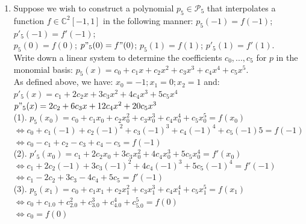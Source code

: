\documentclass[14pt,a4paper]{article}
\begin{document}
	\begin{enumerate}
		\item Suppose we wish to construct a polynomial $p_5 \in \mathcal{P}_5$ that interpolates a function $f \in \mathbb{C}^2[-1, 1]$ in the following manner: $p_5(-1) = f(-1)$; \hspace{0.2cm} $p'_5(-1) = f'(-1)$;\\ $p_5(0) = f(0)$; \hspace{0.2cm} $ p"_5(0) = f"(0)$; \hspace{0.2cm} $p_5(1) = f(1)$; \hspace{0.2cm} $p'_5(1) = f'(1)$.  \\
		Write down a linear system to determine the coefficients $c_0, ..., c_5$ for $p$ in the monomial basis: $p_5(x) = c_0 + c_1x + c_2x^2 + c_3x^3 + c_4x^4 + c_5x^5$.\\
		As defined above, we have: $x_0 = -1; x_1 = 0; x_2 = 1$ and:\\
		\hspace*{2cm} $p'_5(x) = c_1 + 2c_2x + 3c_3x^2 + 4c_4x^3 + 5c_5x^4$\\
		\hspace*{2cm} $p"_5(x) = 2c_2 + 6c_3x + 12c_4x^2 + 20c_5x^3$\\
		(1). $ p_5(x_0) = c_0 + c_1x_0 + c_2x_0^2 + c_3x_0^3 + c_4x_0^4 + c_5x_0^5 = f(x_0)$\\
		\hspace*{1.9cm} $ \Leftrightarrow c_0 + c_1(-1) + c_2(-1)^2 + c_3(-1)^3 + c_4(-1)^4 + c_5(-1)5 = f(-1)$\\
		\hspace*{1.9cm} $ \Leftrightarrow c_0 - c_1 + c_2 - c_3 + c_4 - c_5 = f(-1)$\\
		(2). $p'_5(x_0) = c_1 + 2c_2x_0 + 3c_3x_0^2 + 4c_4x_0^3 + 5c_5x_0^4 = f'(x_0)$\\
		\hspace*{1.85cm} $ \Leftrightarrow c_1 + 2c_2(-1) + 3c_3(-1)^2 + 4c_4(-1)^3 + 5c_5(-1)^4 = f'(-1)$ \\
		\hspace*{1.85cm} $ \Leftrightarrow c_1 - 2c_2 + 3c_3 - 4c_4 + 5c_5 = f'(-1)$\\
		(3). $ p_5(x_1) = c_0 + c_1x_1 + c_2x_1^2 + c_3x_1^3 + c_4x_1^4 + c_5x_1^5 = f(x_1)$\\
		\hspace*{1.85cm} $ \Leftrightarrow c_0 + c_1.0 + c_2.0^2 + c_3.0^3 + c_4.0^4 + c_5.0^5 = f(0)$ \\
		\hspace*{1.85cm} $ \Leftrightarrow c_0 = f(0)$ \\

\end{enumerate}
\end{document}
